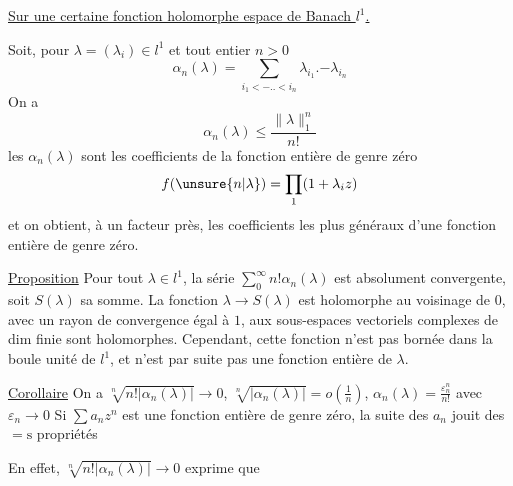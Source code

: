 \uline{Sur une certaine fonction holomorphe  espace de Banach $l^1$.}

Soit, pour $\lambda=(\lambda_i)\in l^1$ et tout entier $n>0$
\[
\alpha_n(\lambda)=\sum_{i_1<\mathord{-}\mathord{.}\mathord{.}<i_n}\lambda_{i_1}\mathord{.}\mathord{-}\lambda_{i_n}
\]
On a
\[
\alpha_n(\lambda)\leq\frac{\|\lambda\|_1^n}{n!}
\]
les $\alpha_n(\lambda)$ sont les coefficients de la fonction entière
de genre zéro
\[
f(\unsure{n|\lambda})=\prod_1(1+\lambda_i z)
\]
et on obtient, à un facteur  près, les
coefficients les plus généraux d'une fonction entière
de genre zéro.

\uline{Proposition} Pour tout $\lambda\in l^1$, la série $\sum_0^\infty n!\alpha_n(\lambda)$
est absolument convergente, soit $S(\lambda)$ sa somme.
La fonction $\lambda\to S(\lambda)$ est holomorphe au voisinage
de $0$, avec un rayon de convergence égal à $1$,
  aux sous-espaces vectoriels
complexes de dim finie sont holomorphes.
Cependant,  cette fonction n'est pas bornée
dans la boule unité de $l^1$, et n'est par
suite pas une fonction entière de $\lambda$.

\uline{Corollaire} On a  $\sqrt[n]{n!|\alpha_n(\lambda)|}\to 0$,
$\sqrt[n]{|\alpha_n(\lambda)|}=o\left(\frac{1}{n}\right)$, $\alpha_n(\lambda)=\frac{\varepsilon_n^n}{n!}$ avec $\varepsilon_n\to 0$
Si $\sum a_nz^n$ est une fonction entière de
genre zéro, la suite des $a_n$ jouit
des $=\mathrm s$ propriétés

En effet, $\sqrt[n]{n!|\alpha_n(\lambda)|}\to 0$ exprime que
